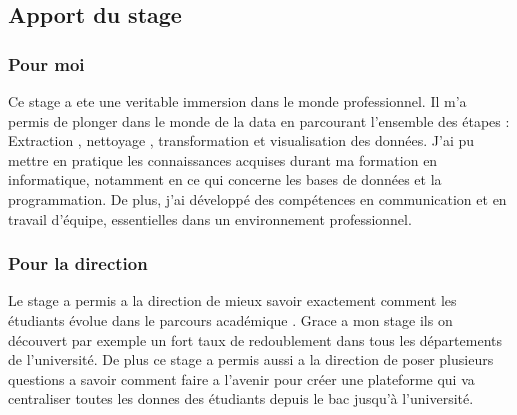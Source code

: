 \subsection{Apport du stage} 
\subsubsection{Pour moi} 
Ce stage a ete une veritable immersion dans le monde professionnel. Il m'a permis de plonger dans le monde de la data en parcourant l’ensemble des étapes : Extraction , nettoyage , transformation et visualisation des données. J'ai pu mettre en pratique les connaissances acquises durant ma formation en informatique, notamment en ce qui concerne les bases de données et la programmation. De plus, j'ai développé des compétences en communication et en travail d'équipe, essentielles dans un environnement professionnel.
\subsubsection{Pour la direction}
Le stage a permis a la direction de mieux savoir exactement comment les étudiants évolue dans le parcours académique . Grace a mon stage ils on découvert par exemple un fort taux de redoublement dans tous les départements de l'université. De plus ce stage a permis aussi a la direction de poser plusieurs questions a savoir comment faire a l'avenir pour créer une plateforme qui va centraliser toutes les donnes des étudiants depuis le bac jusqu'à l'université.  
 

